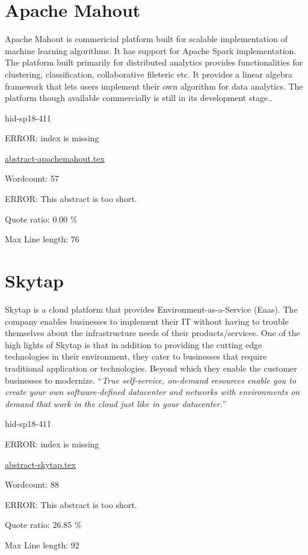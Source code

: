 \section{Apache Mahout}
Apache Mahout is commericial platform built for scalable implementation of
machine learning algorithms. It has support for Apache Spark implementation.
The platform built primarily for distributed analytics provides
functionalities for clustering, classification, collaborative fileteric etc.
It provides a linear algebra framework that lets users implement their own
algorithm for data analytics. The platform though available commercially is
still in its development stage.\cite{hid-sp18-411-apachemahout}.

\begin{IU}

hid-sp18-411

ERROR: index is missing

\href{https://github.com/cloudmesh-community/hid-sp18-411/blob/master//technology/abstract-apachemahout.tex}{abstract-apachemahout.tex}

 

Wordcount: 57

ERROR: This abstract is too short.


Quote ratio: 0.00 \%
 
Max Line length: 76
\end{IU}

\section{Skytap}

Skytap is a cloud platform that provides Environment-as-a-Service (Eaas). The
company enables businesses to implement their IT without having to
trouble themselves about the infrastructure needs of their products/services.
One of the high lights of Skytap is that in addition to providing the
cutting edge technologies in their environment, they cater to businesses that
require traditional application or technologies. Beyond which they enable the
customer businesses to modernize. \color{blue}``\emph{True self-service, on-demand resources
enable you to create your own software-defined datacenter and networks with
environments on demand that work in the cloud just like in your 
datacenter.}''\color{black}~\cite{hid-sp18-411-skytap}


\begin{IU}

hid-sp18-411

ERROR: index is missing

\href{https://github.com/cloudmesh-community/hid-sp18-411/blob/master//technology/abstract-skytap.tex}{abstract-skytap.tex}

 

Wordcount: 88

ERROR: This abstract is too short.


Quote ratio: 26.85 \%
 
Max Line length: 92
\end{IU}

